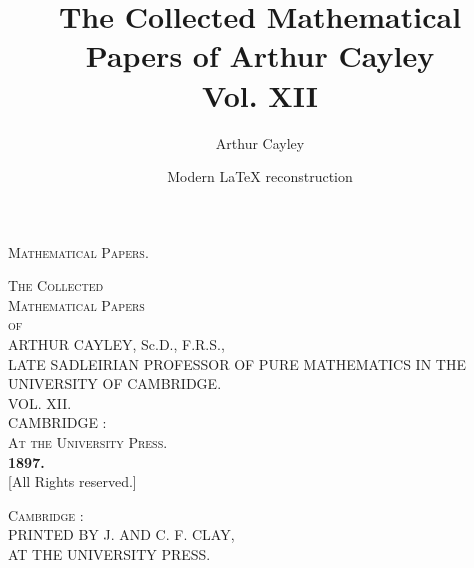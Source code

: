 \documentclass[11pt,a4paper]{book}
\title{The Collected Mathematical Papers of Arthur Cayley\\Vol. XII}
\author{Arthur Cayley}
\date{Modern \LaTeX{} reconstruction}
\begin{document}
\maketitle


\thispagestyle{empty}
\begin{center}
\vspace*{4cm}
{\LARGE\scshape Mathematical Papers.}
\vfill
\end{center}
\cleardoublepage

\thispagestyle{empty}
\begin{center}
\vspace*{1cm}
{\Large\scshape The Collected}\\[0.5cm]
{\Huge\scshape Mathematical Papers}\\[1cm]
{\large\scshape of}\\[1cm]
{\LARGE ARTHUR CAYLEY, Sc.D., F.R.S.,}\\[0.3cm]
{\small LATE SADLEIRIAN PROFESSOR OF PURE MATHEMATICS IN THE UNIVERSITY OF CAMBRIDGE.}\\[2cm]
{\LARGE VOL. XII.}\\[2cm]
{\large CAMBRIDGE :}\\[0.3cm]
{\scshape At the University Press.}\\[0.3cm]
{\bfseries 1897.}\\[0.5cm]
{[All Rights reserved.]}\\
\end{center}
\cleardoublepage

\thispagestyle{empty}
\vspace*{\fill}
\begin{center}
{\scshape Cambridge} :\\[0.3cm]
PRINTED BY J. AND C. F. CLAY,\\
AT THE UNIVERSITY PRESS.\\
\end{center}
\vspace*{\fill}
\cleardoublepage
\end{document}
